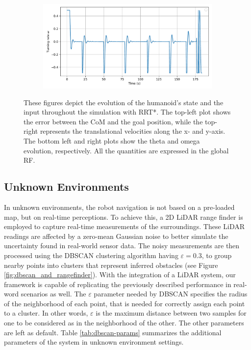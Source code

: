 \begin{figure}[H]
\begin{subfigure}{0.45\linewidth}
    \end{subfigure}
    \begin{subfigure}{0.45\linewidth}
        \centering
        \includegraphics[width=\linewidth]{figures/Simulations/sim_rrt/evolution_3.pdf}
    \end{subfigure}
    \caption{These figures depict the evolution of the humanoid's state and the input throughout the simulation with RRT*. The top-left plot shows the error between the CoM and the goal position, while the top-right represents the translational velocities along the x- and y-axis. The bottom left and right plots show the theta and omega evolution, respectively. All the quantities are expressed in the global RF.}
    \label{fig:sim_rrt_evol}
\end{figure}




\subsection{Unknown Environments}
In unknown environments, the robot navigation is not based on a pre-loaded map, but on real-time perceptions.
To achieve this, a 2D LiDAR range finder is employed to capture real-time measurements of the surroundings.
These LiDAR readings are affected by a zero-mean Gaussian noise to better simulate the uncertainty found in real-world sensor data.
The noisy measurements are then processed using the DBSCAN clustering algorithm having $\varepsilon = 0.3$, to
group nearby points into clusters that represent inferred obstacles (see Figure \ref{fig:dbscan_and_rangefinder}).
With the integration of a LiDAR system, our framework is capable of replicating the previously described performance
in real-word scenarios as well.
The $\varepsilon$ parameter needed by DBSCAN specifies the radius of the neighborhood of each point, that is
needed for correctly assign each point to a cluster. In other words,
$\varepsilon$ is the maximum distance between two samples for
one to be considered as in the neighborhood of the other.
The other parameters are left as default. Table \ref{tab:dbscan-params} summarizes the additional parameters of the
system in unknown environment settings.

